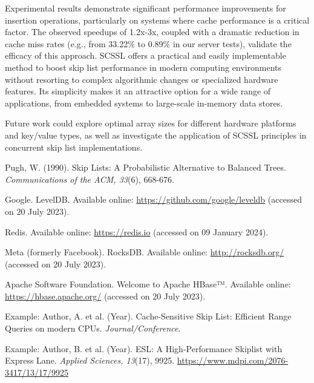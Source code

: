 \documentclass{article}
\begin{document}
Experimental results demonstrate significant performance improvements for insertion operations, particularly on systems where cache performance is a critical factor. The observed speedups of 1.2x-3x, coupled with a dramatic reduction in cache miss rates (e.g., from 33.22\% to 0.89\% in our server tests), validate the efficacy of this approach. SCSSL offers a practical and easily implementable method to boost skip list performance in modern computing environments without resorting to complex algorithmic changes or specialized hardware features. Its simplicity makes it an attractive option for a wide range of applications, from embedded systems to large-scale in-memory data stores.

Future work could explore optimal array sizes for different hardware platforms and key/value types, as well as investigate the application of SCSSL principles in concurrent skip list implementations.

\begin{thebibliography}{9}

Pugh, W. (1990). Skip Lists: A Probabilistic Alternative to Balanced Trees. \emph{Communications of the ACM, 33}(6), 668-676.

Google. LevelDB. Available online: \url{https://github.com/google/leveldb} (accessed on 20 July 2023).

Redis. Available online: \url{https://redis.io} (accessed on 09 January 2024).

Meta (formerly Facebook). RocksDB. Available online: \url{http://rocksdb.org/} (accessed on 20 July 2023).

Apache Software Foundation. Welcome to Apache HBase™. Available online: \url{https://hbase.apache.org/} (accessed on 20 July 2023).

Example: Author, A. et al. (Year). Cache-Sensitive Skip List: Efficient Range Queries on modern CPUs. \emph{Journal/Conference}.

Example: Author, B. et al. (Year). ESL: A High-Performance Skiplist with Express Lane. \emph{Applied Sciences, 13}(17), 9925. \url{https://www.mdpi.com/2076-3417/13/17/9925}

\end{thebibliography}
\end{document}
